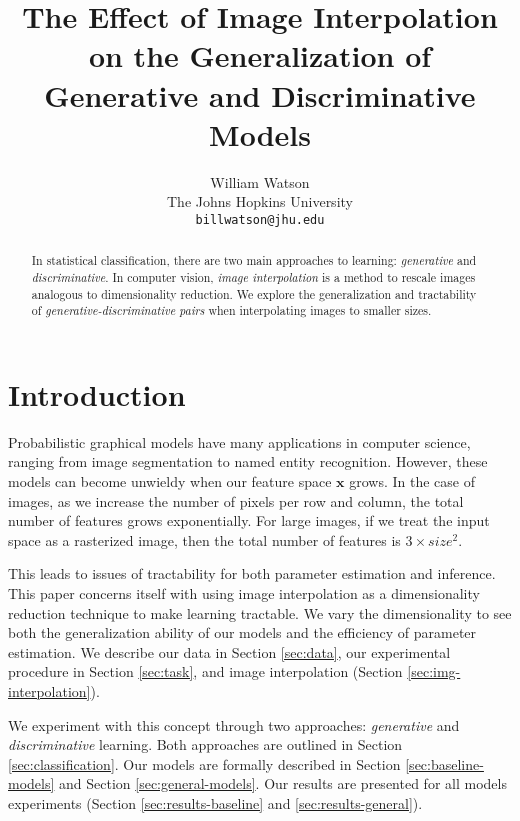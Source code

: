\documentclass{article}
\title{The Effect of Image Interpolation on the Generalization of Generative and Discriminative Models}
\author{%
  William Watson \\
  The Johns Hopkins University\\
  \texttt{billwatson@jhu.edu} \\
}
\begin{document}

\maketitle

\begin{abstract}
  In statistical classification, there are two main approaches to learning:
  \textit{generative} and \textit{discriminative}. In computer vision,
  \textit{image interpolation} is a method to rescale images analogous to
  dimensionality reduction. We explore the generalization and tractability of
  \textit{generative-discriminative pairs} when interpolating images to smaller
  sizes.
\end{abstract}



\section{Introduction}
\label{sec:intro}
Probabilistic graphical models have many applications in computer science,
ranging from image segmentation to named entity recognition. However, these
models can become unwieldy when our feature space $\mathbf{x}$ grows. In the
case of images, as we increase the number of pixels per row and column, the
total number of features grows exponentially. For large images, if we treat
the input space as a rasterized image, then the total number of features is
$3 \times size^{2}$.

This leads to issues of tractability for both parameter estimation and
inference. This paper concerns itself with using image interpolation as
a dimensionality reduction technique to make learning tractable. We vary the
dimensionality to see both the generalization ability of our models and the
efficiency of parameter estimation. We describe our data in Section \ref{sec:data},
our experimental procedure in Section \ref{sec:task}, and image interpolation
(Section \ref{sec:img-interpolation}).

We experiment with this concept through two approaches: \textit{generative}
and \textit{discriminative} learning. Both approaches are outlined in Section
\ref{sec:classification}. Our models are formally described in Section
\ref{sec:baseline-models} and Section \ref{sec:general-models}. Our results
are presented for all models experiments (Section \ref{sec:results-baseline} and
\ref{sec:results-general}).
\end{document}
